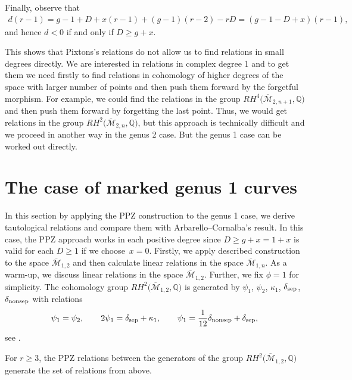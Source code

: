 \documentclass[pdftex]{sigma}
\def\oM{\overline{\mathcal{M}}}
\numberwithin{equation}{section}
\begin{document}
 Finally, observe that
\begin{align*}
d(r-1) = g-1+D+x(r-1) + (g-1)(r-2) - r D = (g - 1- D + x)(r - 1),
\end{align*}
and hence
$ d<0$ if and only if $D\geq g+x$.

This shows that Pixtons's relations do not allow us to find relations in small degrees directly. We are interested in relations in complex degree 1 and to get them we need firstly to find relations in cohomology of higher degrees of the space with larger number of points and then push them forward by the forgetful morphism. For example, we could find the relations in the group $RH^4\big(\oM_{2,n+1},\mathbb{Q}\big)$ and then push them forward by forgetting the last point. Thus, we would get relations in the group $RH^2\big(\oM_{2,n},\mathbb{Q}\big)$, but this approach is technically difficult and we proceed in another way in the genus 2 case. But the genus 1 case can be worked out directly.

\section{The case of marked genus 1 curves}
In this section by applying the PPZ construction to the genus 1 case, we derive tautological relations and compare them with Arbarello--Cornalba's result. In this case, the PPZ approach works in each positive degree since $D\geq g+x =1+x$ is valid for each $D\geq1$ if we choose~${x=0}$.
Firstly, we apply described construction to the space $\oM_{1,2}$ and then calculate linear relations in the space $\oM_{1,n}$.
As a warm-up, we discuss linear relations in the space $\oM_{1,2}$. Further, we fix ${\phi=1}$ for simplicity.
The cohomology group $RH^2\big(\oM_{1,2},\mathbb{Q}\big)$ is generated by $\psi_1$, $\psi_2$, $\kappa_1$, $\delta_{\rm sep}$, $\delta_{\rm nonsep}$ with relations
\begin{align*}
\psi_1 = \psi_2,\qquad
2\psi_1 =\delta_{\rm sep}+\kappa_1,\qquad
 \psi_1 =\dfrac{1}{12}\delta_{\rm nonsep}+\delta_{\rm sep},
\end{align*}
see \cite[Theorem 2.2]{Cor}.

\begin{Example}
For $r\geq3$, the PPZ relations between the generators of the group $RH^2\big(\oM_{1,2},\mathbb{Q}\big)$ generate the set of relations from above.
\end{Example}
\end{document}
